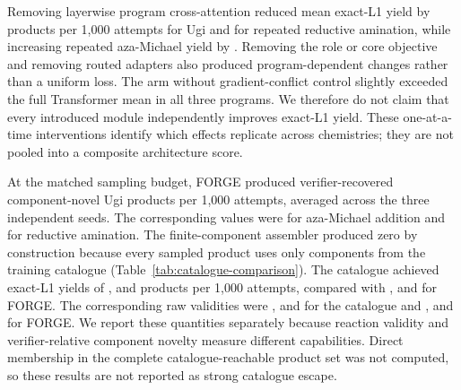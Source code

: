 \documentclass{article}
\begin{document}
Removing layerwise program cross-attention reduced mean exact-L1 yield by
\ForgeProseNoCrossAttentionUgiReduction{} products per 1,000 attempts for Ugi and
\ForgeProseNoCrossAttentionLXReduction{} for repeated reductive amination, while increasing repeated
aza-Michael yield by \ForgeProseNoCrossAttentionBLIncrease{}. Removing the role or core objective and
removing routed adapters also produced
program-dependent changes rather than a uniform loss. The arm without gradient-conflict control
slightly exceeded the full Transformer mean in all three programs. We therefore do not claim that
every introduced module independently improves exact-L1 yield. These one-at-a-time interventions
identify which effects replicate across chemistries; they are not pooled into a composite
architecture score.

At the matched sampling budget, FORGE produced
\ForgeProseCatalogueForgeUgiComponentNovelPerThousand{} verifier-recovered component-novel Ugi
products per 1,000 attempts, averaged across the three independent seeds. The corresponding
values were \ForgeProseCatalogueForgeBLComponentNovelPerThousand{} for aza-Michael addition and
\ForgeProseCatalogueForgeLXComponentNovelPerThousand{} for reductive amination. The finite-component
assembler produced zero by construction because every sampled product uses only components from
the training catalogue (Table~\ref{tab:catalogue-comparison}).
The catalogue achieved exact-L1 yields of
\ForgeProseCatalogueCatalogueUgiExactPerThousand{},
\ForgeProseCatalogueCatalogueBLExactPerThousand{} and
\ForgeProseCatalogueCatalogueLXExactPerThousand{} products per 1,000 attempts, compared with
\ForgeProseCatalogueForgeUgiExactPerThousand{},
\ForgeProseCatalogueForgeBLExactPerThousand{} and
\ForgeProseCatalogueForgeLXExactPerThousand{} for FORGE. The corresponding raw validities were
\ForgeProseCatalogueCatalogueUgiValidPerThousand{},
\ForgeProseCatalogueCatalogueBLValidPerThousand{} and
\ForgeProseCatalogueCatalogueLXValidPerThousand{} for the catalogue and
\ForgeProseCatalogueForgeUgiValidPerThousand{},
\ForgeProseCatalogueForgeBLValidPerThousand{} and
\ForgeProseCatalogueForgeLXValidPerThousand{} for FORGE.
We report these quantities separately because reaction validity and verifier-relative component
novelty measure different capabilities. Direct membership in the complete catalogue-reachable
product set was not computed, so these results are not reported as strong catalogue escape.
\end{document}
